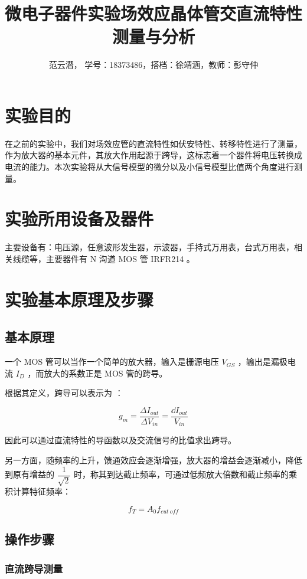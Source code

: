 \documentclass[lang=cn,11pt,a4paper,cite=authoryear]{elegantpaper}
\title{微电子器件实验\quad 场效应晶体管交直流特性测量与分析}
\author{范云潜， 学号：18373486，搭档：徐靖涵，教师：彭守仲}
\institute{微电子学院 184111 班}
\date{\zhtoday}
\begin{document}
\maketitle


\section{实验目的}

在之前的实验中，我们对场效应管的直流特性如伏安特性、转移特性进行了测量，作为放大器的基本元件，其放大作用起源于跨导，这标志着一个器件将电压转换成电流的能力。本次实验将从大信号模型的微分以及小信号模型比值两个角度进行测量。

\section{实验所用设备及器件}


主要设备有：电压源，任意波形发生器，示波器，手持式万用表，台式万用表，相关线缆等，主要器件有 N 沟道 MOS 管 IRFR214 。

\section{实验基本原理及步骤}

\subsection{基本原理}

一个 MOS 管可以当作一个简单的放大器，输入是栅源电压 \(V_{GS}\) ，输出是漏极电流 \(I_{D}\) ，而放大的系数正是 MOS 管的跨导。

根据其定义，跨导可以表示为 ： 

\[g_m = \frac{\Delta I_{out}}{\Delta V_{in}} = \frac{\dd{I_{out}}}{V_{in}} \]  

因此可以通过直流特性的导函数以及交流信号的比值求出跨导。

另一方面，随频率的上升，馈通效应会逐渐增强，放大器的增益会逐渐减小，降低到原有增益的 \(\dfrac{1}{\sqrt{2}}\) 时，称其到达截止频率，可通过低频放大倍数和截止频率的乘积计算特征频率：

\[f_T = A_0 f_{cut\: off}\] 

\subsection{操作步骤}

\subsubsection{直流跨导测量}
\end{document}
